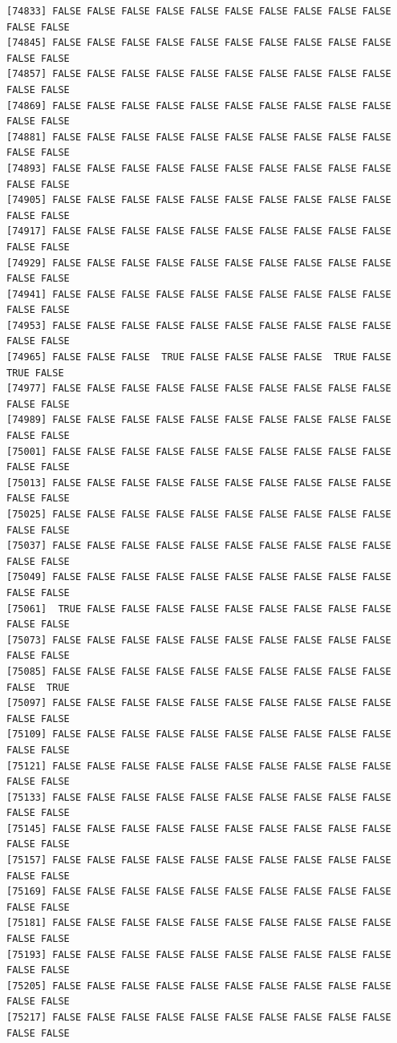 \documentclass[
  a4paper,
  DIV=11,
  numbers=noendperiod]{scrartcl}
\begin{document}
\begin{verbatim}
[74833] FALSE FALSE FALSE FALSE FALSE FALSE FALSE FALSE FALSE FALSE FALSE FALSE
[74845] FALSE FALSE FALSE FALSE FALSE FALSE FALSE FALSE FALSE FALSE FALSE FALSE
[74857] FALSE FALSE FALSE FALSE FALSE FALSE FALSE FALSE FALSE FALSE FALSE FALSE
[74869] FALSE FALSE FALSE FALSE FALSE FALSE FALSE FALSE FALSE FALSE FALSE FALSE
[74881] FALSE FALSE FALSE FALSE FALSE FALSE FALSE FALSE FALSE FALSE FALSE FALSE
[74893] FALSE FALSE FALSE FALSE FALSE FALSE FALSE FALSE FALSE FALSE FALSE FALSE
[74905] FALSE FALSE FALSE FALSE FALSE FALSE FALSE FALSE FALSE FALSE FALSE FALSE
[74917] FALSE FALSE FALSE FALSE FALSE FALSE FALSE FALSE FALSE FALSE FALSE FALSE
[74929] FALSE FALSE FALSE FALSE FALSE FALSE FALSE FALSE FALSE FALSE FALSE FALSE
[74941] FALSE FALSE FALSE FALSE FALSE FALSE FALSE FALSE FALSE FALSE FALSE FALSE
[74953] FALSE FALSE FALSE FALSE FALSE FALSE FALSE FALSE FALSE FALSE FALSE FALSE
[74965] FALSE FALSE FALSE  TRUE FALSE FALSE FALSE FALSE  TRUE FALSE  TRUE FALSE
[74977] FALSE FALSE FALSE FALSE FALSE FALSE FALSE FALSE FALSE FALSE FALSE FALSE
[74989] FALSE FALSE FALSE FALSE FALSE FALSE FALSE FALSE FALSE FALSE FALSE FALSE
[75001] FALSE FALSE FALSE FALSE FALSE FALSE FALSE FALSE FALSE FALSE FALSE FALSE
[75013] FALSE FALSE FALSE FALSE FALSE FALSE FALSE FALSE FALSE FALSE FALSE FALSE
[75025] FALSE FALSE FALSE FALSE FALSE FALSE FALSE FALSE FALSE FALSE FALSE FALSE
[75037] FALSE FALSE FALSE FALSE FALSE FALSE FALSE FALSE FALSE FALSE FALSE FALSE
[75049] FALSE FALSE FALSE FALSE FALSE FALSE FALSE FALSE FALSE FALSE FALSE FALSE
[75061]  TRUE FALSE FALSE FALSE FALSE FALSE FALSE FALSE FALSE FALSE FALSE FALSE
[75073] FALSE FALSE FALSE FALSE FALSE FALSE FALSE FALSE FALSE FALSE FALSE FALSE
[75085] FALSE FALSE FALSE FALSE FALSE FALSE FALSE FALSE FALSE FALSE FALSE  TRUE
[75097] FALSE FALSE FALSE FALSE FALSE FALSE FALSE FALSE FALSE FALSE FALSE FALSE
[75109] FALSE FALSE FALSE FALSE FALSE FALSE FALSE FALSE FALSE FALSE FALSE FALSE
[75121] FALSE FALSE FALSE FALSE FALSE FALSE FALSE FALSE FALSE FALSE FALSE FALSE
[75133] FALSE FALSE FALSE FALSE FALSE FALSE FALSE FALSE FALSE FALSE FALSE FALSE
[75145] FALSE FALSE FALSE FALSE FALSE FALSE FALSE FALSE FALSE FALSE FALSE FALSE
[75157] FALSE FALSE FALSE FALSE FALSE FALSE FALSE FALSE FALSE FALSE FALSE FALSE
[75169] FALSE FALSE FALSE FALSE FALSE FALSE FALSE FALSE FALSE FALSE FALSE FALSE
[75181] FALSE FALSE FALSE FALSE FALSE FALSE FALSE FALSE FALSE FALSE FALSE FALSE
[75193] FALSE FALSE FALSE FALSE FALSE FALSE FALSE FALSE FALSE FALSE FALSE FALSE
[75205] FALSE FALSE FALSE FALSE FALSE FALSE FALSE FALSE FALSE FALSE FALSE FALSE
[75217] FALSE FALSE FALSE FALSE FALSE FALSE FALSE FALSE FALSE FALSE FALSE FALSE

\end{verbatim}
\end{document}
